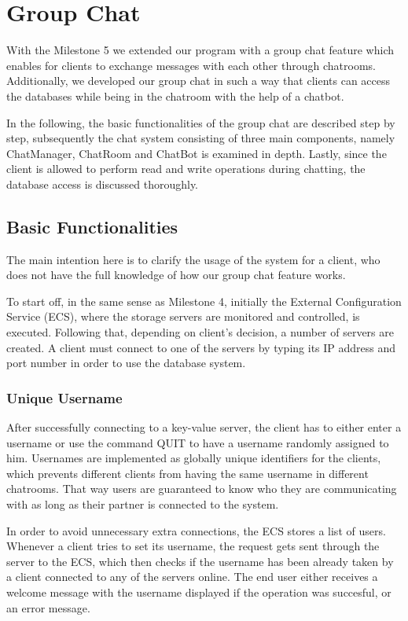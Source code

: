 \section{Group Chat}
\label{sec:groupchat}
With the Milestone 5 we extended our program with a group chat feature which enables for clients to exchange messages with each other through chatrooms. Additionally, we developed our group chat in such a way that clients can access the databases while being in the chatroom with the help of a chatbot.
 
In the following, the basic functionalities of the group chat are described step by step, subsequently the chat system consisting of three main components, namely ChatManager, ChatRoom and ChatBot is examined in depth. Lastly, since the client is allowed to perform read and write operations during chatting, the database access is discussed thoroughly.  

\subsection{Basic Functionalities}
\label{sec:groupchat_functionalities}
The main intention here is to clarify the usage of the system for a client, who does not have the full knowledge of how our group chat feature works.

To start off, in the same sense as Milestone 4, initially the External Configuration Service (ECS), where the storage servers are monitored and controlled, is executed. Following that, depending on client's decision, a number of servers are created. A client must connect to one of the servers by typing its IP address and port number in order to use the database system.

\subsubsection{Unique Username}
\label{sec:groupchat_funtionalities_uniqueusername}
After successfully connecting to a key-value server, the client has to either enter a username or use the command QUIT to have a username randomly assigned to him. Usernames are implemented as globally unique identifiers for the clients, which prevents different clients from having the same username in different chatrooms. That way users are guaranteed to know who they are communicating with as long as their partner is connected to the system. 

In order to avoid unnecessary extra connections, the ECS stores a list of users. Whenever a client tries to set its username, the request gets sent through the server to the ECS, which then checks if the username has been already taken by a client connected to any of the servers online. The end user either receives a welcome message with the username displayed if the operation was succesful, or an error message.
 
